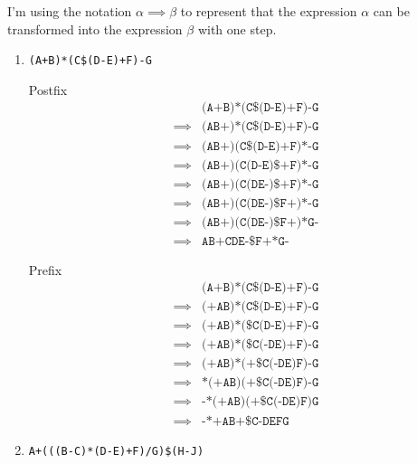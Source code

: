 \documentclass[12pt,letterpaper,final]{report}
\begin{document}
I'm using the notation $\alpha \implies \beta$ to represent that the expression $\alpha$ can be transformed into the expression $\beta$ with one step.
\begin{enumerate}
  \item \texttt{(A+B)*(C\$(D-E)+F)-G}

        Postfix
        \begin{align*}
                   & \texttt{(A+B)*(C\$(D-E)+F)-G}                           \\
          \implies & \boxed{\texttt{(AB+)}}\texttt{*(C\$(D-E)+F)-G}          \\
          \implies & \boxed{\texttt{(AB+)(C\$(D-E)+F)*}}\texttt{-G}          \\
          \implies & \texttt{(AB+)(}\boxed{\texttt{C(D-E)\$}}\texttt{+F)*-G} \\
          \implies & \texttt{(AB+)(C(}\boxed{\texttt{DE-}}\texttt{)\$+F)*-G} \\
          \implies & \texttt{(AB+)(C(DE-)\$}\boxed{\texttt{F+}}\texttt{)*-G} \\
          \implies & \texttt{(AB+)(C(DE-)\$F+)*}\boxed{\texttt{G-}}          \\
          \implies & \texttt{AB+CDE-\$F+*G-}
        \end{align*}

        Prefix
        \begin{align*}
                   & \texttt{(A+B)*(C\$(D-E)+F)-G}                           \\
          \implies & \boxed{\texttt{(+AB)}}\texttt{*(C\$(D-E)+F)-G}          \\
          \implies & \texttt{(+AB)*(}\boxed{\texttt{\$C(D-E)}}\texttt{+F)-G} \\
          \implies & \texttt{(+AB)*(\$C}\boxed{\texttt{(-DE)}}\texttt{+F)-G} \\
          \implies & \texttt{(+AB)*}\boxed{\texttt{(+\$C(-DE)F)}}\texttt{-G} \\
          \implies & \boxed{\texttt{*(+AB)(+\$C(-DE)F)}}\texttt{-G}          \\
          \implies & \boxed{\texttt{-*(+AB)(+\$C(-DE)F)G}}                   \\
          \implies & \texttt{-*+AB+\$C-DEFG}
        \end{align*}

  \item \texttt{A+(((B-C)*(D-E)+F)/G)\$(H-J)}


\end{enumerate}
\end{document}
